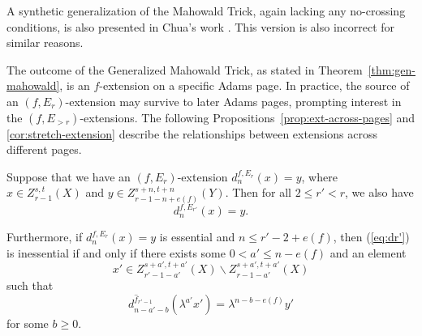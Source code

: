 \begin{remark}
  A synthetic generalization of the Mahowald Trick, again lacking any no-crossing conditions, is also presented in Chua's work \cite[Theorem~12.11]{Chua}. This version is also incorrect for similar reasons.
\end{remark}

The outcome of the Generalized Mahowald Trick, as stated in Theorem~\ref{thm:gen-mahowald}, is an $f$-extension on a specific Adams page. In practice, the source of an $(f, E_r)$-extension may survive to later Adams pages, prompting interest in the $(f, E_{>r})$-extensions. The following Propositions~\ref{prop:ext-across-pages} and \ref{cor:stretch-extension} describe the relationships between extensions across different pages.

\begin{proposition}\label{prop:ext-across-pages}
    Suppose that we have an $(f,E_r)$-extension $d^{f,E_r}_n(x)=y$, where $x\in Z_{r-1}^{s,t}(X)$ and $y\in Z_{r-1-n+e(f)}^{s+n,t+n}(Y)$. Then for all $2\le r'<r$, we also have
    \begin{equation}\label{eq:dr'}
        d^{f,E_{r'}}_n(x)=y.
    \end{equation}

    Furthermore, if $d^{f,E_r}_n(x)=y$ is essential and $n\le r'-2+e(f)$, then (\ref{eq:dr'}) is inessential if and only if there exists some $0<a'\le n-e(f)$ and an element
    $$x'\in Z_{r'-1-a'}^{s+a',t+a'}(X)\backslash Z_{r-1-a'}^{s+a',t+a'}(X)$$
    such that
    $$d^{\hat f_{r'-1}}_{n-a'-b}(\lambda^{a'} x')=\lambda^{n-b-e(f)} y'$$
    for some $b\ge 0$.
    
\end{proposition}

